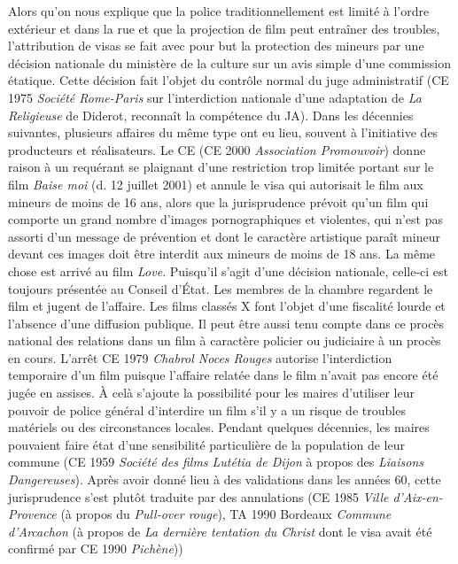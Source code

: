 \documentclass[math]{cours}
\begin{document}
Alors qu'on nous explique que la police traditionnellement est limité à l'ordre extérieur et dans la rue et que la projection de film peut entraîner des troubles, l'attribution de visas se fait avec pour but la protection des mineurs par une décision nationale du ministère de la culture sur un avis simple d'une commission étatique.
Cette décision fait l'objet du contrôle normal du juge administratif (CE 1975 \emph{Société Rome-Paris} sur l'interdiction nationale d'une adaptation de \emph{La Religieuse} de Diderot, reconnaît la compétence du JA).
Dans les décennies suivantes, plusieurs affaires du même type ont eu lieu, souvent à l'initiative des producteurs et réalisateurs.
Le CE (CE 2000 \emph{Association Promouvoir}) donne raison à un requérant se plaignant d'une restriction trop limitée portant sur le film \emph{Baise moi} (d. 12 juillet 2001) et annule le visa qui autorisait le film aux mineurs de moins de 16 ans, alors que la jurisprudence prévoit qu'un film qui comporte un grand nombre d'images pornographiques et violentes, qui n'est pas assorti d'un message de prévention et dont le caractère artistique paraît mineur devant ces images doit être interdit aux mineurs de moins de 18 ans.
La même chose est arrivé au film \emph{Love}.
Puisqu'il s'agit d'une décision nationale, celle-ci est toujours présentée au Conseil d'État.
Les membres de la chambre regardent le film et jugent de l'affaire.
Les films classés X font l'objet d'une fiscalité lourde et l'absence d'une diffusion publique.
Il peut être aussi tenu compte dans ce procès national des relations dans un film à caractère policier ou judiciaire à un procès en cours.
L'arrêt CE 1979 \emph{Chabrol Noces Rouges} autorise l'interdiction temporaire d'un film puisque l'affaire relatée dans le film n'avait pas encore été jugée en assises.
À celà s'ajoute la possibilité pour les maires d'utiliser leur pouvoir de police général d'interdire un film s'il y a un risque de troubles matériels ou des circonstances locales.
Pendant quelques décennies, les maires pouvaient faire état d'une sensibilité particulière de la population de leur commune (CE 1959 \emph{Société des films Lutétia de Dijon} à propos des \emph{Liaisons Dangereuses}).
Après avoir donné lieu à des validations dans les années 60, cette jurisprudence s'est plutôt traduite par des annulations (CE 1985 \emph{Ville d'Aix-en-Provence} (à propos du \emph{Pull-over rouge}), TA 1990 Bordeaux \emph{Commune d'Arcachon} (à propos de \emph{La dernière tentation du Christ} dont le visa avait été confirmé par CE 1990 \emph{Pichène}))
\end{document}
